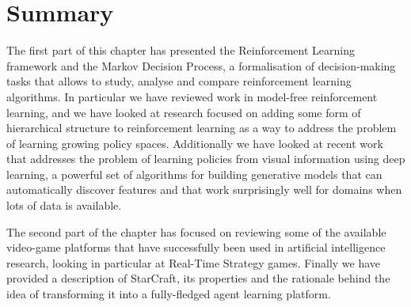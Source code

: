\section{Summary}

The first part of this chapter has presented the Reinforcement Learning
framework and the Markov Decision Process, a formalisation of decision-making
tasks that allows to study, analyse and compare reinforcement learning
algorithms. In particular we have reviewed work in model-free reinforcement
learning, and we have looked at research focused on adding some form of
hierarchical structure to reinforcement learning as a way to address the problem
of learning growing policy spaces. Additionally we have looked at recent work
that addresses the problem of learning policies from visual information using
deep learning, a powerful set of algorithms for building generative models that
can automatically discover features and that work surprisingly well for domains
when lots of data is available.

The second part of the chapter has focused on reviewing some of the available
video-game platforms that have successfully been used in artificial intelligence
research, looking in particular at Real-Time Strategy games. Finally we have
provided a description of StarCraft, its properties and the rationale behind the
idea of transforming it into a fully-fledged agent learning platform.

